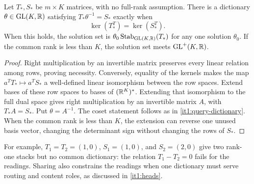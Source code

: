 \documentclass[11pt,letterpaper]{report}
\begin{document}
Let $T_*,S_*$ be $m\times K$ matrices, with no full-rank assumption. There is a dictionary $\theta\in\mathrm{GL}(K,\mathbb R)$ satisfying $T_*\theta^{-1}=S_*$ exactly when
\begin{equation}
\ker(T_*^T)=\ker(S_*^T).
\label{it1:stack-relations}
\end{equation}
When this holds, the solution set is $\theta_0\operatorname{Stab}_{\mathrm{GL}(K,\mathbb R)}(T_*)$ for any one solution $\theta_0$. If the common rank is less than $K$, the solution set meets $\mathrm{GL}^+(K,\mathbb R)$.
\begin{proof}
Right multiplication by an invertible matrix preserves every linear relation among rows, proving necessity. Conversely, equality of the kernels makes the map $a^TT_*\mapsto a^TS_*$ a well-defined linear isomorphism between the row spaces. Extend bases of these row spaces to bases of $(\mathbb R^K)^*$. Extending that isomorphism to the full dual space gives right multiplication by an invertible matrix $A$, with $T_*A=S_*$. Put $\theta=A^{-1}$. The coset statement follows as in \cref{it1:query-dictionary}. When the common rank is less than $K$, the extension can reverse one unused basis vector, changing the determinant sign without changing the rows of $S_*$.
\end{proof}
For example, $T_1=T_2=(1,0)$, $S_1=(1,0)$, and $S_2=(2,0)$ give two rank-one stacks but no common dictionary: the relation $T_1-T_2=0$ fails for the readings. Sharing also constrains the readings when one dictionary must serve routing and content roles, as discussed in \cref{it1:heads}.
\end{document}
